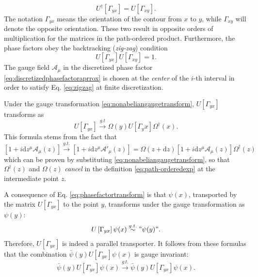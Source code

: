 \begin{equation}
  U^\dagger\left[\Gamma_{yx}\right] = U\left[\Gamma_{xy}\right].
\end{equation}
The notation $\Gamma_{yx}$ means the orientation of the contour from $x$ to
$y$, while $\Gamma_{xy}$ will denote the opposite orientation. These two result
in opposite orders of multiplication for the matrices in the path-ordered
product. Furthermore, the phase factors obey the backtracking
(\textit{zig-zag}) condition
\begin{equation}
  U\left[\Gamma_{yx}\right]U\left[\Gamma_{xy}\right] = 1.
  \label{eq:zigzag}
\end{equation}
The gauge field $\mathcal{A}_\mu$ in the discretized phase factor
\eqref{eq:discretizedphasefactoraprrox} is chosen at the \textit{center} of the
$i$-th interval in order to satisfy Eq. \eqref{eq:zigzag} at finite
discretization.
\par Under the gauge transformation \eqref{eq:nonabeliangaugetransform},
$U\left[\Gamma_{yx}\right]$ transforms as
\begin{equation}
  U\left[\Gamma_{yx}\right]\xrightarrow{g.t}\Omega(y)U\left[\Gamma_yx\right]\Omega^\dagger(x).
  \label{eq:phasefactortransform}
\end{equation}
This formula stems from the fact that
\begin{equation}
  \left[1+i\mathrm{d}z^\mu\mathcal{A}_\mu(z)\right]\xrightarrow{g.t.}\left[1+i\mathrm{d}z^\mu\mathcal{A}'_\mu(z)\right]=\Omega(z+\mathrm{d}z)\left[1+i\mathrm{d}z^\mu\mathcal{A}_\mu(z)\right]\Omega^\dagger(z)
\end{equation}
which can be proven by substituting \eqref{eq:nonabeliangaugetransform}, so
that $\Omega^\dagger(z)$ and $\Omega(z)$ \textit{cancel} in the definition
\eqref{eq:path-orderedexp} at the intermediate point $z$.
\par A consequence of Eq. \eqref{eq:phasefactortransform} is that $\psi(x)$,
transported by the matrix $U\left[\Gamma_{yx}\right]$ to the point $y$,
transforms under the gauge transformation as $\psi(y)$:
\begin{equation}
  U\left[\Gamma_{yx}\right]\psi(x)\stackrel{g.t.}{\sim}"\psi(y)".
\end{equation}
Therefore, $U\left[\Gamma_{yx}\right]$ is indeed a parallel transporter.
It follows from these formulas that the combination
$\bar{\psi}(y)U\left[\Gamma_{yx}\right]\psi(x)$ is gauge invariant:
\begin{equation}
  \bar{\psi}(y)U\left[\Gamma_{yx}\right]\psi(x)\xrightarrow{g.t.}\bar{\psi}(y)U\left[\Gamma_{yx}\right]\psi(x).
\end{equation}
